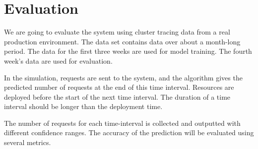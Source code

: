 \section{Evaluation}

We are going to evaluate the system using cluster tracing data from a real
production environment. The data set contains data over about a month-long
period. The data for the first three weeks are used for model training. The
fourth week's data are used for evaluation. 

In the simulation, requests are sent to the system, and the algorithm gives the
predicted number of requests at the end of this time interval. Resources are
deployed before the start of the next time interval. The duration of a time
interval should be longer than the deployment time.

The number of requests for each time-interval is collected and outputted with
different confidence ranges. The accuracy of the prediction will be evaluated
using several metrics.
